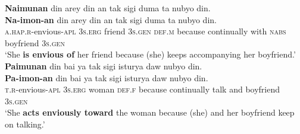 \ea
    \ea
    \textbf{Naimunan}  din  arey  din  an   tak  sigi  duma  ta  nubyo  din. \\\smallskip
\gll \textbf{Na-imon-an}  din  arey  din  an   tak  sigi  duma  ta  nubyo  din. \\
    \textsc{a.hap.r}-envious-\textsc{apl}  3\textsc{s.erg} friend  3\textsc{s.gen}  \textsc{def.m}
    because  continually  with  \textsc{nabs}  boyfriend  3\textsc{s.gen} \\
    \glt ‘She \textbf{is envious of} her friend because (she) keeps accompanying her boyfriend.’ \\
    \ex
    \textbf{Paimunan}  din  bai  ya  tak  sigi  isturya  daw  nubyo  din. \\\smallskip
\gll \textbf{Pa-imon-an}  din  bai  ya  tak  sigi  isturya  daw  nubyo  din. \\
    \textsc{t.r}-envious-\textsc{apl}  3\textsc{s.erg}  woman  \textsc{def.f} because  continually  talk  and  boyfriend  3\textsc{s.gen} \\
    \glt ‘She \textbf{acts enviously toward} the woman because (she) and her boyfriend keep on talking.’
    \z
\z

